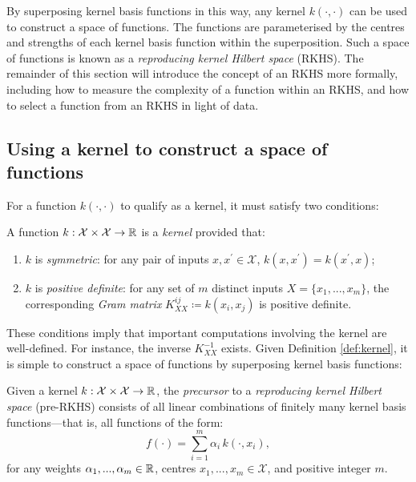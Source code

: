 \begin{refsection}
By superposing kernel basis functions in this way, any kernel $k(\cdot,\cdot)$ can be used to construct a space of functions. The functions are parameterised by the centres and strengths of each kernel basis function within the superposition. Such a space of functions is known as a \textit{reproducing kernel Hilbert space} (RKHS). The remainder of this section will introduce the concept of an RKHS more formally, including how to measure the complexity of a function within an RKHS, and how to select a function from an RKHS in light of data.

\subsection{Using a kernel to construct a space of functions} 

For a function $k(\cdot,\cdot)$ to qualify as a kernel, it must satisfy two conditions:

\begin{definition}[Kernel]\label{def:kernel} A function $k:\mathcal{X}\times\mathcal{X}\to\mathbb{R}$ is a \textit{kernel} provided that:
\begin{enumerate}[label=\roman*)]
    \item $k$ is \textit{symmetric}: for any pair of inputs $x,x^\prime \in \mathcal{X}$, $k(x,x^\prime) = k(x^\prime, x)$;
    \item $k$ is \textit{positive definite}: for any set of $m$ distinct inputs $X=\{x_1,...,x_m\}$, the corresponding \textit{Gram matrix} $K_{XX}^{ij}\coloneqq k(x_i,x_j)$ is positive definite.
\end{enumerate}
\end{definition}
These conditions imply that important computations involving the kernel are well-defined. For instance, the inverse $K_{XX}^{-1}$ exists. Given Definition \ref{def:kernel}, it is simple to construct a space of functions by superposing kernel basis functions:

\begin{definition}\label{def:pre-rkhs} Given a kernel $k: \mathcal{X} \times \mathcal{X} \to \mathbb{R}$, the \textit{precursor} to a \textit{reproducing kernel Hilbert space} (pre-RKHS) consists of all linear combinations of finitely many kernel basis functions---that is, all functions of the form:
\begin{equation}
    f(\cdot)=\sum_{i=1}^m \alpha_i \, k(\cdot,x_i),
\end{equation}
for any weights $\alpha_1,...,\alpha_m\in\mathbb{R}$, centres $x_1, ..., x_m \in \mathcal{X}$, and positive integer $m$.
\end{definition}


\end{refsection}
